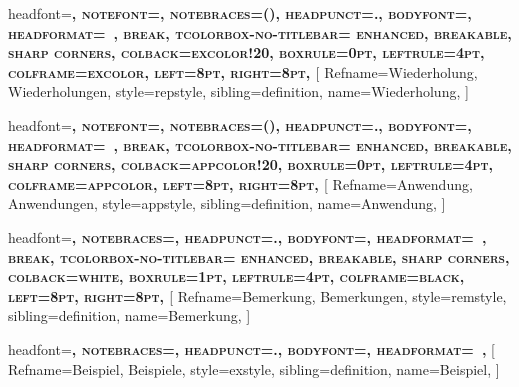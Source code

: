 {
headfont=\normalfont\scshape\bfseries,
notefont=\normalfont\bfseries,
notebraces={(}{)},  %
headpunct={.},
bodyfont=\normalfont,
headformat=\NAME~\NUMBER\NOTE,
break,
tcolorbox-no-titlebar={
    enhanced,
    breakable,
    sharp corners,
    colback=excolor!20,
    boxrule=0pt,
    leftrule=4pt,       
    colframe=excolor,
    left=8pt,
    right=8pt,
  }
}
[
  Refname={Wiederholung, Wiederholungen},
  style=repstyle, 
  sibling=definition,
  name=Wiederholung,
]

{
headfont=\normalfont\scshape\bfseries,
notefont=\normalfont\bfseries,
notebraces={(}{)},  %
headpunct={.},
bodyfont=\normalfont,
headformat=\NAME~\NUMBER\NOTE,
break,
tcolorbox-no-titlebar={
    enhanced,
    breakable,
    sharp corners,
    colback=appcolor!20,
    boxrule=0pt,
    leftrule=4pt,       
    colframe=appcolor,
    left=8pt,
    right=8pt,
  }
}
[
  Refname={Anwendung, Anwendungen},
  style=appstyle, 
  sibling=definition,
  name=Anwendung,
]

{
headfont=\normalfont\bfseries\scshape,
notebraces={}{},
headpunct={.},
bodyfont=\normalfont,
headformat=\NAME~\NUMBER\NOTE,
break,
tcolorbox-no-titlebar={
    enhanced,
    breakable,
    sharp corners,
    colback=white,
    boxrule=1pt,  
    leftrule=4pt,    
    colframe=black,
    left=8pt,
    right=8pt,
  }
}
[
  Refname={Bemerkung, Bemerkungen},
  style=remstyle,
  sibling=definition,
  name=Bemerkung,
]

{
headfont=\normalfont\bfseries\scshape,
notebraces={}{},
headpunct={.},
bodyfont=\normalfont,
headformat=\NAME~\NUMBER\NOTE,
}
[
  Refname={Beispiel, Beispiele},
  style=exstyle,  
  sibling=definition,
  name=Beispiel,
]



